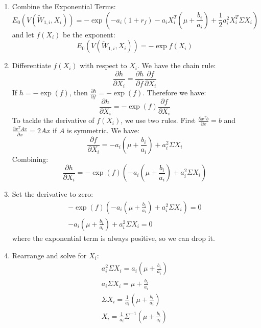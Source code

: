 \begin{enumerate}
    \item Combine the Exponential Terms:
    \begin{equation}
        E_0(V(\tilde{W}_{1,i}, X_i)) = -\exp{(-a_i(1 + r_f)-a_iX_i^T(\mu + \frac{b_i}{a_i})+\frac{1}{2}a_i^2X_i^T\Sigma X_i)}
    \end{equation}
    and let $f(X_i)$ be the exponent:
    \begin{equation}
        E_0(V(\tilde{W}_{1,i}, X_i)) = -\exp{f(X_i)}
    \end{equation}
    \item Differentiate $f(X_i)$ with respect to $X_i$. We have the 
    chain rule:
    \begin{equation}
        \frac{\partial h}{\partial X_i} = \frac{\partial h}{\partial f} \frac{\partial f}{\partial X_i}
    \end{equation}
    If $h = - \exp{(f)}$, then $\frac{\partial h}{\partial f} = - \exp{(f)}$. 
    Therefore we have:
    \begin{equation}
        \frac{\partial h}{\partial X_i} = -\exp{(f)} \frac{\partial f}{\partial X_i}
    \end{equation}
    To tackle the derivative of $f(X_i)$, we use two rules. First $\frac{\partial x^T b}{\partial x} = b$ and
    $\frac{\partial x^T A x}{\partial x} = 2Ax$ if $A$ is symmetric. We have:
    \begin{equation}
        \frac{\partial f}{\partial X_i} = -a_i(\mu + \frac{b_i}{a_i}) + a_i^2 \Sigma X_i
    \end{equation}
    Combining:
    \begin{equation}
        \frac{\partial h}{\partial X_i} = -\exp{(f)} ( -a_i(\mu + \frac{b_i}{a_i}) + a_i^2 \Sigma X_i)
    \end{equation}
    \item Set the derivative to zero:
    \begin{equation}
        \begin{aligned}
            -\exp{(f)} ( -a_i(\mu + \frac{b_i}{a_i}) + a_i^2 \Sigma X_i) = 0 \\
            -a_i(\mu + \frac{b_i}{a_i}) + a_i^2 \Sigma X_i = 0
        \end{aligned}
    \end{equation}
    where the exponential term is always positive, so we can drop it.
    \item Rearrange and solve for $X_i$:
    \begin{equation}
        \begin{aligned}
            a_i^2 \Sigma X_i = a_i(\mu + \frac{b_i}{a_i}) \\
            a_i \Sigma X_i = \mu + \frac{b_i}{a_i} \\
            \Sigma X_i = \frac{1}{a_i}( \mu + \frac{b_i}{a_i}) \\
            X_i = \frac{1}{a_i} \Sigma^{-1}(\mu + \frac{b_i}{a_i})
        \end{aligned}
    \end{equation}
\end{enumerate}


